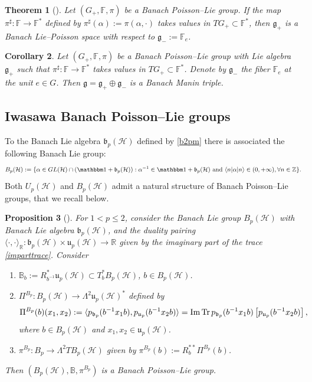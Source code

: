 \documentclass[a4paper,12pt,reqno]{amsart}%
\newtheorem{theorem}{Theorem}
\newtheorem{proposition}[theorem]{Proposition}
\newtheorem{corollary}[theorem]{Corollary}
\theoremstyle{definition}
\theoremstyle{remark}
\numberwithin{theorem}{section}
\numberwithin{equation}{section}
\newcommand{\1}{{\bf 1}}
\newcommand{\Id}{\mathbbm 1}
\DeclareMathOperator{\Tr}{\textnormal{Tr}}
\DeclareMathOperator{\im}{\textnormal{Im}}
\newcommand{\g}{{\mathfrak g}}
\begin{document}
\begin{theorem}[{\cite[Theorem~5.13]{tumpach-bruhat}}]\label{PL_LP}
Let $(G_+, \mathbb{F}, \pi)$ be  a Banach Poisson--Lie group. If the map $\pi^{\sharp}: \mathbb{F} \rightarrow \mathbb{F}^*$ defined by $\pi^{\sharp}(\alpha) := \pi(\alpha, \cdot)$ takes values in  $TG_+\subset \mathbb{F}^*$, then $\mathfrak{g}_+$ is a Banach Lie--Poisson space with respect to $\mathfrak{g}_-:=  \mathbb{F}_e$.
\end{theorem}


\begin{corollary}
    Let $(G_+, \mathbb{F}, \pi)$ be  a Banach Poisson--Lie group with Lie algebra $\g_+$ such that $\pi^{\sharp}: \mathbb{F} \rightarrow \mathbb{F}^*$ takes values in $TG_+\subset \mathbb{F}^*$.  Denote by $\g_-$ the fiber $\mathbb{F}_e$ at the unit $e\in G$. Then $\g = \g_+ \oplus \g_-$ is a Banach Manin triple.
\end{corollary}

\subsection{Iwasawa Banach Poisson--Lie groups}
To the Banach Lie algebra $\mathfrak{b}_{p}(\mathcal{H})$ defined by \eqref{b2pm} there is associated the following Banach Lie group:
\[
B_{p}(\mathcal{H}) := \{\alpha\in GL(\mathcal{H})\cap \left(\Id+\mathfrak{b}_{p}(\mathcal{H})\right): \alpha^{-1}\in \Id +\mathfrak{b}_{p}(\mathcal{H}) ~\textrm{and}~\langle n|\alpha|n\rangle\in(0, +\infty), \forall n\in\mathbb{Z}\}.
\]
Both $U_p(\mathcal{H})$ and $B_p(\mathcal{H})$ admit a natural structure of Banach Poisson--Lie groups, that we recall below.

\begin{proposition}[{\cite[Proposition~5.9]{tumpach-bruhat}}]\label{Bp}
For $1<p\leq 2$, consider the Banach Lie group $B_{p}(\mathcal{H})$ with Banach Lie algebra $\mathfrak{b}_p(\mathcal{H})$, and the duality pairing $\langle\cdot,\cdot\rangle_{\mathbb{R}}: \mathfrak{b}_p(\mathcal{H})\times \mathfrak{u}_p(\mathcal{H})\rightarrow \mathbb{R}$ given by the imaginary part of the trace \eqref{imparttrace}.
Consider
\begin{enumerate}
\item $\mathbb{B}_b:= R_{b^{-1}}^*\mathfrak{u}_p(\mathcal{H}) \subset T^*_b B_{p}(\mathcal{H})$, $b\in B_{p}(\mathcal{H})$.
\item $\Pi^{B_p}:B_{p}(\mathcal{H})\rightarrow \Lambda^2\mathfrak{u}_p(\mathcal{H})^*$ defined by 
\begin{equation}\label{PiBp}
\Pi^{B_p}(b)(x_1, x_2) := \langle p_{\mathfrak{b}_p}(b^{-1}x_1b), p_{\mathfrak{u}_p}(b^{-1}x_2 b)\rangle = \im\Tr p_{\mathfrak{b}_p}(b^{-1}x_1b)\left[ p_{\mathfrak{u}_p}(b^{-1}x_2 b) \right], 
\end{equation}
where $b\in B_{p}(\mathcal{H})$ and $x_1, x_2\in \mathfrak{u}_p(\mathcal{H})$.
\item $\pi^{B_{p}}: B_{p} \rightarrow \Lambda^2 T B_{p}(\mathcal{H})$ given by $\pi^{B_{p}}(b) := R_{b}^{**}\Pi^{B_{p}}(b)$.
\end{enumerate}
Then $(B_{p}(\mathcal{H}), \mathbb{B}, \pi^{B_{p}})$ is a Banach Poisson--Lie group.
\end{proposition}
\end{document}
